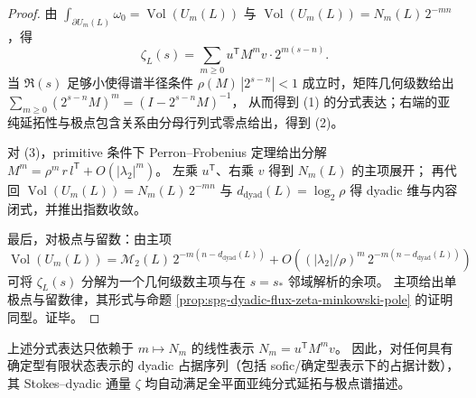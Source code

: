 \begin{proof}
由 \(\int_{\partial U_m(L)}\omega_0=\operatorname{Vol}(U_m(L))\) 与 \(\operatorname{Vol}(U_m(L))=N_m(L)\,2^{-mn}\)，得
\[
\zeta_L(s)=\sum_{m\ge 0}u^{\mathsf T}M^m v\cdot 2^{m(s-n)}.
\]
当 \(\Re(s)\) 足够小使得谱半径条件 \(\rho(M)\,|2^{s-n}|<1\) 成立时，矩阵几何级数给出
\(
\sum_{m\ge 0}(2^{s-n}M)^m=(I-2^{s-n}M)^{-1}
\)，
从而得到 (1) 的分式表达；右端的亚纯延拓性与极点包含关系由分母行列式零点给出，得到 (2)。
\par
对 (3)，primitive 条件下 Perron--Frobenius 定理给出分解
\(
M^m=\rho^m\,r\,l^{\mathsf T}+O(|\lambda_2|^m)
\)。
左乘 \(u^{\mathsf T}\)、右乘 \(v\) 得到 \(N_m(L)\) 的主项展开；
再代回 \(\operatorname{Vol}(U_m(L))=N_m(L)\,2^{-mn}\) 与 \(d_{\mathrm{dyad}}(L)=\log_2\rho\) 得 dyadic 维与内容闭式，并推出指数收敛。
\par
最后，对极点与留数：由主项
\(
\operatorname{Vol}(U_m(L))=\mathcal M_2(L)\,2^{-m(n-d_{\mathrm{dyad}}(L))}+O((|\lambda_2|/\rho)^m\,2^{-m(n-d_{\mathrm{dyad}}(L))})
\)
可将 \(\zeta_L(s)\) 分解为一个几何级数主项与在 \(s=s_\ast\) 邻域解析的余项。
主项给出单极点与留数律，其形式与命题 \ref{prop:spg-dyadic-flux-zeta-minkowski-pole} 的证明同型。证毕。
\end{proof}

\begin{remark}[有限状态线性表示的统一口径]\label{rem:spg-fsa-linear-representation-zeta-rationality}
上述分式表达只依赖于 \(m\mapsto N_m\) 的线性表示 \(N_m=u^{\mathsf T}M^m v\)。
因此，对任何具有确定型有限状态表示的 dyadic 占据序列（包括 sofic/确定型表示下的占据计数），其 Stokes--dyadic 通量 \(\zeta\) 均自动满足全平面亚纯分式延拓与极点谱描述。
\end{remark}

\endinput

